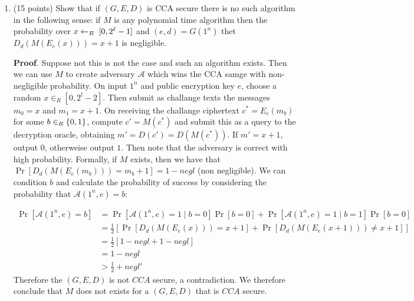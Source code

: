 \documentclass{article}
\begin{document}
\begin{enumerate}
\begin{enumerate}[noitemsep,topsep=\mdcompacttopsep,label=\alph*.]
\item{}(15 points) Show that if $(G,E,D)$ is CCA secure there is no such algorithm in the following sense: if $M$ is any polynomial time algorithm then the probability over $x\leftarrow_R\; [0,2^{\ell}-1]$ and $(e,d)=G(1^n)$ thet $D_d(M(E_e(x)))=x+1$ is negligible.

\begin{mdbmarginx}{1ex}{0pt}{1ex}{0pt}%
\noindent{}\textbf{Proof}.  Suppose not this is not the case and such an algorithm exists. Then we can 
use $M$ to create adversary $\mathcal{A}$ which wins the CCA samge with non-negligible probability. 
On input $1^n$ and public encryption key $e$, choose a random $x \in_R [0,2^l - 2]$. Then submit
as challange texts the messages $m_0 = x$ and $m_1 = x + 1$. On receiving the challange ciphertext
$c^* = E_e(m_b)$ for some $b \in_R \{0,1\}$, compute $c' = M(c^*)$ and submit this as a query 
to the decryption oracle, obtaining $m' = D(c') = D(M(c^*))$. If $m' = x + 1$, output $0$, otherweise
output $1$. Then note that the adversary is correct with high probability. Formally, if $M$ exists,
then we have that $\Pr[D_d(M(E_e(m_b))) = m_b + 1] = 1 - negl$ (non negligible). We can condition $b$ and calculate
the probability of success by considering the probability that $\mathcal{A}(1^n,e) = b$:%
\end{mdbmarginx}%
\noindent\noindent\[%
\begin{aligned}
\Pr[\mathcal{A}(1^n,e) = b] &= \Pr[\mathcal{A}(1^n,e) = 1 \mid b = 0]\Pr[b = 0] + \Pr[\mathcal{A}(1^n,e) =1 \mid b = 1]\Pr[b = 0] \\
&= \frac{1}{2}[\Pr[D_d(M(E_e(x))) = x + 1] + \Pr[D_d(M(E_e(x+1))) \neq x + 1]] \\
&= \frac{1}{2}[1 - negl + 1 - negl] \\
&= 1 - negl \\
&> \frac{1}{2} + negl'
\end{aligned}
\]%
Therefore the $(G,E,D)$ is not $CCA$ secure, a contradiction. We therefore conclude that $M$ does not
exists for a $(G,E,D)$ that is $CCA$ secure.%
\end{enumerate}%


\end{enumerate}
\end{document}
